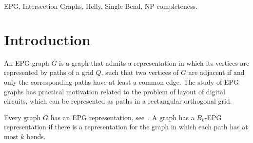 \documentclass[a4paper,11pt]{article}
\begin{document}
\begin{abstract}


\end{abstract}

\bigskip
\begin{keywords}
EPG, Intersection Graphs, Helly, Single Bend, NP-completeness.

\bigskip
{}
\end{keywords}

\newpage

\section{Introduction}

An EPG graph $G$ is a graph that admits a representation in which its vertices are represented by paths of a grid $Q$, such that two vertices of $G$ are adjacent if and only the corresponding paths have at least a common edge. The study of EPG graphs has practical motivation related to the problem of layout of digital circuits, which can be represented as paths in a rectangular orthogonal grid.

Every graph $G$ has an EPG representation, see~\citep{golumbic2009}. A graph has a $ B_k$-EPG representation if there is a representation for the graph in which each path has at most $k$ bends.
\end{document}
